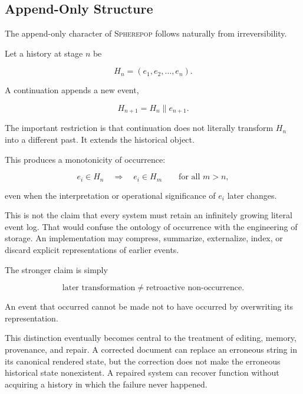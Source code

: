 \documentclass[11pt]{article}
\theoremstyle{remark}
\newcommand{\Spherepop}{\textsc{Spherepop}}
\begin{document}
\subsection{Append-Only Structure}

The append-only character of \Spherepop{} follows naturally from irreversibility.

Let a history at stage $n$ be

\begin{equation}
H_n
=
(e_1,e_2,\ldots,e_n).
\end{equation}

A continuation appends a new event,

\begin{equation}
H_{n+1}
=
H_n \mathbin{\|} e_{n+1}.
\end{equation}

The important restriction is that continuation does not literally transform $H_n$ into a different past. It extends the historical object.

This produces a monotonicity of occurrence:

\begin{equation}
e_i \in H_n
\quad\Rightarrow\quad
e_i \in H_m
\qquad
\text{for all }m>n,
\end{equation}

even when the interpretation or operational significance of $e_i$ later changes.

This is not the claim that every system must retain an infinitely growing literal event log. That would confuse the ontology of occurrence with the engineering of storage. An implementation may compress, summarize, externalize, index, or discard explicit representations of earlier events.

The stronger claim is simply

\begin{equation}
\text{later transformation}
\neq
\text{retroactive non-occurrence}.
\end{equation}

An event that occurred cannot be made not to have occurred by overwriting its representation.

This distinction eventually becomes central to the treatment of editing, memory, provenance, and repair. A corrected document can replace an erroneous string in its canonical rendered state, but the correction does not make the erroneous historical state nonexistent. A repaired system can recover function without acquiring a history in which the failure never happened.
\end{document}
